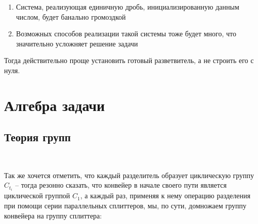 \begin{enumerate}
	\item Система, реализующая единичную дробь, инициализированную данным числом, будет банально громоздкой
	\item Возможных способов реализации такой системы тоже будет много, что значительно усложняет решение задачи
\end{enumerate}

\noindent Тогда действительно проще установить готовый разветвитель, а не строить его с нуля.




\newpage

\section{Алгебра задачи}

\subsection{Теория групп}

\

Так же хочется отметить, что каждый разделитель образует циклическую группу $C_{t_i}$ -- тогда резонно сказать, что конвейер в начале своего пути является циклической группой $C_1$, а каждый раз, применяя к нему операцию разделения при помощи серии параллельных сплиттеров, мы, по сути, домножаем группу конвейера на группу сплиттера:






\vspace{0.5in}


